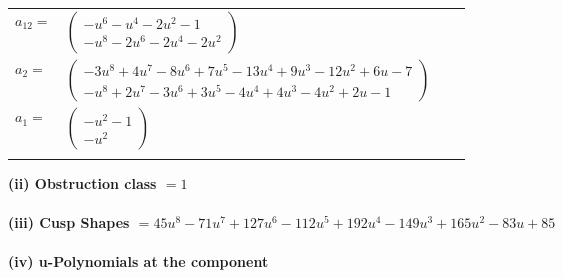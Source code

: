\documentclass[1p]{elsarticle_modified}
\theoremstyle{definition}
\begin{document}
\begin{tabular}{m{7pt} m{180pt} m{7pt} m{180pt} }
\flushright $a_{12}=$&$\begin{pmatrix}- u^6- u^4-2 u^2-1\\- u^8-2 u^6-2 u^4-2 u^2\end{pmatrix}$ \\
\flushright $a_{2}=$&$\begin{pmatrix}-3 u^8+4 u^7-8 u^6+7 u^5-13 u^4+9 u^3-12 u^2+6 u-7\\- u^8+2 u^7-3 u^6+3 u^5-4 u^4+4 u^3-4 u^2+2 u-1\end{pmatrix}$ \\
\flushright $a_{1}=$&$\begin{pmatrix}- u^2-1\\- u^2\end{pmatrix}$\\&\end{tabular}
\flushleft \textbf{(ii) Obstruction class $= 1$}\\~\\
\flushleft \textbf{(iii) Cusp Shapes $= 45 u^8-71 u^7+127 u^6-112 u^5+192 u^4-149 u^3+165 u^2-83 u+85$}\\~\\
\newpage\renewcommand{\arraystretch}{1}
\flushleft \textbf{(iv) u-Polynomials at the component}\newline \\
\end{document}
